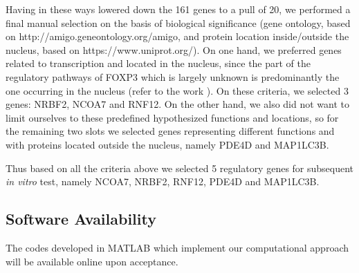 \documentclass[oneside, 10pt, a4paper, twocolumn]{article}
\begin{document}
{Having in these ways lowered down the 161 genes to a pull of 20, we performed a final manual selection on the basis of biological significance (gene ontology, based on http://amigo.geneontology.org/amigo, and protein location inside/outside the nucleus, based on https://www.uniprot.org/). 
On one hand, we preferred genes related to transcription and located in the nucleus, since the part of the regulatory pathways of FOXP3 which is largely unknown is predominantly the one occurring in the nucleus (refer to the work  \cite{Lal2009}). On these criteria, we selected 3 genes: NRBF2, NCOA7 and RNF12. On the other hand, we also did not want to limit ourselves to these predefined hypothesized functions and locations, so for the remaining two slots we selected genes representing different functions and with proteins located outside the nucleus, namely PDE4D and MAP1LC3B.

Thus based on all the criteria above we selected 5 regulatory genes for subsequent \textit{in vitro} test, namely NCOA7, NRBF2, RNF12, PDE4D and MAP1LC3B.

\subsection{Software Availability}

The codes developed in MATLAB which implement our computational approach will be available online upon acceptance.

\clearpage

}
\end{document}
